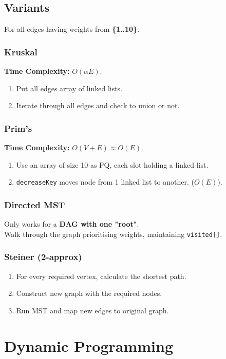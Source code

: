 \documentclass[10pt,landscape,a4paper]{article}
\begin{document}
\begin{multicols*}{4}
\subsection{Variants}
For all edges having weights from \textbf{\{1..10\}}.
\subsubsection{Kruskal}
\textbf{Time Complexity:} $O(\alpha E)$.
\begin{enumerate}
    \item Put all edges array of linked lists.
    \item Iterate through all edges and check to union or not.
\end{enumerate}

\subsubsection{Prim's}
\textbf{Time Complexity:} $O(V + E) \approx O(E)$.
\begin{enumerate}
    \item Use an array of size 10 as PQ, each slot holding a linked list.
    \item \texttt{decreaseKey} moves node from 1 linked list to another. ($O(E)$).
\end{enumerate}

\subsubsection{Directed MST}
Only works for a \textbf{DAG with one "root"}. \\
Walk through the graph prioritising weights, maintaining \texttt{visited[]}. 

\subsubsection{Steiner (2-approx)}
\begin{enumerate}
    \item For every required vertex, calculate the shortest path.
    \item Construct new graph with the required nodes.
    \item Run MST and map new edges to original graph.
\end{enumerate}



\section{Dynamic Programming}


\end{multicols*}
\end{document}
